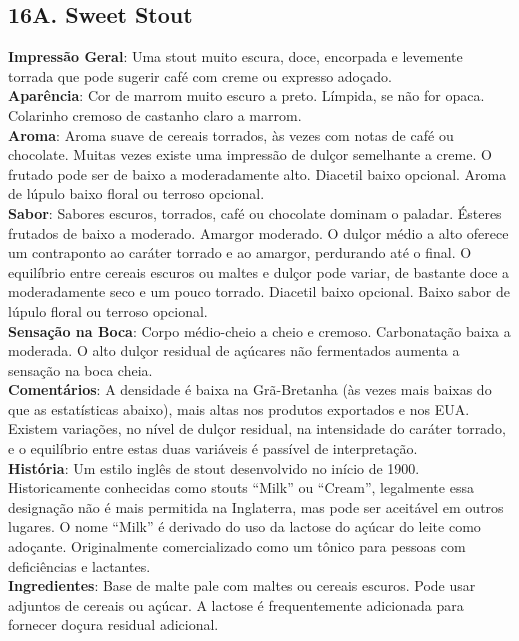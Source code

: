 \subsection*{16A. Sweet Stout}
\textbf{Impressão Geral}: Uma stout muito escura, doce, encorpada e levemente torrada que pode sugerir café com creme ou expresso adoçado. \\
\textbf{Aparência}: Cor de marrom muito escuro a preto. Límpida, se não for opaca. Colarinho cremoso de castanho claro a marrom. \\
\textbf{Aroma}: Aroma suave de cereais torrados, às vezes com notas de café ou chocolate. Muitas vezes existe uma impressão de dulçor semelhante a creme. O frutado pode ser de baixo a moderadamente alto. Diacetil baixo opcional. Aroma de lúpulo baixo floral ou terroso opcional. \\
\textbf{Sabor}: Sabores escuros, torrados, café ou chocolate dominam o paladar. Ésteres frutados de baixo a moderado. Amargor moderado. O dulçor médio a alto oferece um contraponto ao caráter torrado e ao amargor, perdurando até o final. O equilíbrio entre cereais escuros ou maltes e dulçor pode variar, de bastante doce a moderadamente seco e um pouco torrado. Diacetil baixo opcional. Baixo sabor de lúpulo floral ou terroso opcional. \\
\textbf{Sensação na Boca}: Corpo médio-cheio a cheio e cremoso. Carbonatação baixa a moderada. O alto dulçor residual de açúcares não fermentados aumenta a sensação na boca cheia. \\
\textbf{Comentários}: A densidade é baixa na Grã-Bretanha (às vezes mais baixas do que as estatísticas abaixo), mais altas nos produtos exportados e nos EUA. Existem variações, no nível de dulçor residual, na intensidade do caráter torrado, e o equilíbrio entre estas duas variáveis é passível de interpretação. \\
\textbf{História}: Um estilo inglês de stout desenvolvido no início de 1900. Historicamente conhecidas como stouts “Milk” ou “Cream”, legalmente essa designação não é mais permitida na Inglaterra, mas pode ser aceitável em outros lugares. O nome “Milk” é derivado do uso da lactose do açúcar do leite como adoçante. Originalmente comercializado como um tônico para pessoas com deficiências e lactantes. \\
\textbf{Ingredientes}: Base de malte pale com maltes ou cereais escuros. Pode usar adjuntos de cereais ou açúcar. A lactose é frequentemente adicionada para fornecer doçura residual adicional. \\
